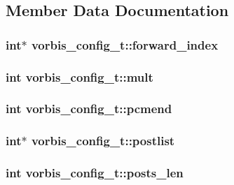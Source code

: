 \subsection{Member Data Documentation}
\hypertarget{structvorbis__config__t_a46cff91e7bc0b1e5b6d1d02c834b3d9a}{
\subsubsection[{forward\_\-index}]{\setlength{\rightskip}{0pt plus 5cm}int$\ast$ {\bf vorbis\_\-config\_\-t::forward\_\-index}}}
\label{structvorbis__config__t_a46cff91e7bc0b1e5b6d1d02c834b3d9a}
\hypertarget{structvorbis__config__t_a59c344a79d6907d529b1c7ae1acb3b0e}{
\subsubsection[{mult}]{\setlength{\rightskip}{0pt plus 5cm}int {\bf vorbis\_\-config\_\-t::mult}}}
\label{structvorbis__config__t_a59c344a79d6907d529b1c7ae1acb3b0e}
\hypertarget{structvorbis__config__t_accdf996ff263ae4c6ef374af4bc1b143}{
\subsubsection[{pcmend}]{\setlength{\rightskip}{0pt plus 5cm}int {\bf vorbis\_\-config\_\-t::pcmend}}}
\label{structvorbis__config__t_accdf996ff263ae4c6ef374af4bc1b143}
\hypertarget{structvorbis__config__t_ad32f3f7431dd4ae075eb4c872ba44b73}{
\subsubsection[{postlist}]{\setlength{\rightskip}{0pt plus 5cm}int$\ast$ {\bf vorbis\_\-config\_\-t::postlist}}}
\label{structvorbis__config__t_ad32f3f7431dd4ae075eb4c872ba44b73}
\hypertarget{structvorbis__config__t_ad3f4331ef085115b3683f25680b32b19}{
\subsubsection[{posts\_\-len}]{\setlength{\rightskip}{0pt plus 5cm}int {\bf vorbis\_\-config\_\-t::posts\_\-len}}}
